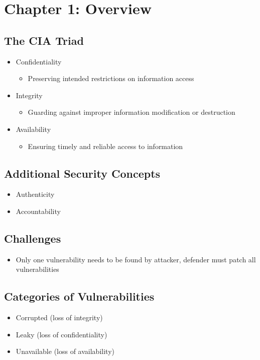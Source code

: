 \documentclass[11pt]{article}
\author{ethan}
\date{\today}
\title{}
\begin{document}
\tableofcontents

\section{Chapter 1: Overview}
\label{sec:orga1c0d61}
\subsection{The CIA Triad}
\label{sec:orga81b7a9}
\begin{itemize}
\item Confidentiality
\begin{itemize}
\item Preserving intended restrictions on information access
\end{itemize}
\item Integrity
\begin{itemize}
\item Guarding against improper information modification or destruction
\end{itemize}
\item Availability
\begin{itemize}
\item Ensuring timely and reliable access to information
\end{itemize}
\end{itemize}
\subsection{Additional Security Concepts}
\label{sec:orgf8a303b}
\begin{itemize}
\item Authenticity
\item Accountability
\end{itemize}
\subsection{Challenges}
\label{sec:orgddb815a}
\begin{itemize}
\item Only one vulnerability needs to be found by attacker,
defender must patch all vulnerabilities
\end{itemize}
\subsection{Categories of Vulnerabilities}
\label{sec:org96f35cd}
\begin{itemize}
\item Corrupted (loss of integrity)
\item Leaky (loss of confidentiality)
\item Unavailable (loss of availability)
\end{itemize}
\end{document}
